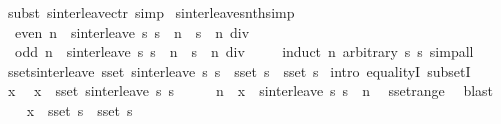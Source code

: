 \begin{isabellebody}
%
\isatagproof
{}\isamarkupfalse%
\ {\isacharparenleft}subst\ sinterleave{\isachardot}ctr{\isacharparenright}\ simp%
\endisatagproof
{\isafoldproof}%
%
\isadelimproof
\isanewline
%
\endisadelimproof
\isanewline
{}\isamarkupfalse%
\ sinterleave{\isacharunderscore}snth{\isacharbrackleft}simp{\isacharbrackright}{\isacharcolon}\isanewline
\ \ {\isachardoublequoteopen}even\ n\ {\isasymLongrightarrow}\ sinterleave\ s{}\ s{}\ {\isacharbang}{\isacharbang}\ n\ {\isacharequal}\ s{}\ {\isacharbang}{\isacharbang}\ {\isacharparenleft}n\ div\ {}{\isacharparenright}{\isachardoublequoteclose}\isanewline
\ \ {\isachardoublequoteopen}odd\ n\ {\isasymLongrightarrow}\ sinterleave\ s{}\ s{}\ {\isacharbang}{\isacharbang}\ n\ {\isacharequal}\ s{}\ {\isacharbang}{\isacharbang}\ {\isacharparenleft}n\ div\ {}{\isacharparenright}{\isachardoublequoteclose}\isanewline
%
\isadelimproof
\ \ %
\endisadelimproof
%
\isatagproof
{}\isamarkupfalse%
\ {\isacharparenleft}induct\ n\ arbitrary{\isacharcolon}\ s{}\ s{}{\isacharparenright}\ simp{\isacharunderscore}all%
\endisatagproof
{\isafoldproof}%
%
\isadelimproof
\isanewline
%
\endisadelimproof
\isanewline
{}\isamarkupfalse%
\ sset{\isacharunderscore}sinterleave{\isacharcolon}\ {\isachardoublequoteopen}sset\ {\isacharparenleft}sinterleave\ s{}\ s{}{\isacharparenright}\ {\isacharequal}\ sset\ s{}\ {\isasymunion}\ sset\ s{}{\isachardoublequoteclose}\isanewline
%
\isadelimproof
%
\endisadelimproof
%
\isatagproof
{}\isamarkupfalse%
\ {\isacharparenleft}intro\ equalityI\ subsetI{\isacharparenright}\isanewline
\ \ \isamarkupfalse%
\ x\ \isamarkupfalse%
\ {\isachardoublequoteopen}x\ {\isasymin}\ sset\ {\isacharparenleft}sinterleave\ s{}\ s{}{\isacharparenright}{\isachardoublequoteclose}\isanewline
\ \ \isamarkupfalse%
\ \isamarkupfalse%
\ n\ \ {\isachardoublequoteopen}x\ {\isacharequal}\ sinterleave\ s{}\ s{}\ {\isacharbang}{\isacharbang}\ n{\isachardoublequoteclose}\ \isamarkupfalse%
\ sset{\isacharunderscore}range\ \isamarkupfalse%
\ blast\isanewline
\ \ \isamarkupfalse%
\ {\isachardoublequoteopen}x\ {\isasymin}\ sset\ s{}\ {\isasymunion}\ sset\ s{}{\isachardoublequoteclose}\ \isamarkupfalse%

\end{isabellebody}
